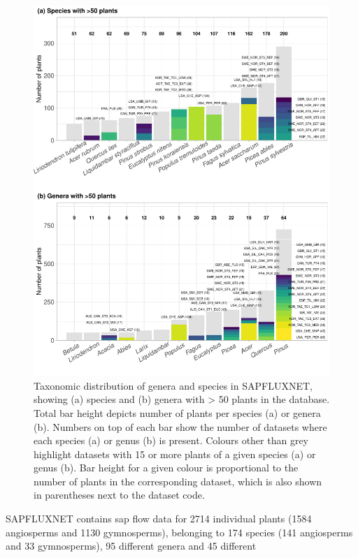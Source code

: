 \documentclass[11pt,twoside]{reedthesis}
\begin{document}
\begin{figure}[H]

{\centering \includegraphics[width=1\linewidth]{figure/CH3/Figure3} 

}

\caption[Taxonomic distribution of genera and species in SAPFLUXNET.]{Taxonomic distribution of genera and species in SAPFLUXNET, showing (a) species and (b) genera with > 50 plants in the database. Total bar height depicts number of plants per species (a) or genera (b). Numbers on top of each bar show the number of datasets where each species (a) or genus (b) is present. Colours other than grey highlight datasets with 15 or more plants of a given species (a) or genus (b). Bar height for a given colour is proportional to the number of plants in the corresponding dataset, which is also shown in parentheses next to the dataset code.}\label{fig:Ch2plot3}
\end{figure}
SAPFLUXNET contains sap flow data for 2714 individual plants (1584
angiosperms and 1130 gymnosperms), belonging to 174 species (141
angiosperms and 33 gymnosperms), 95 different genera and 45 different
\end{document}
